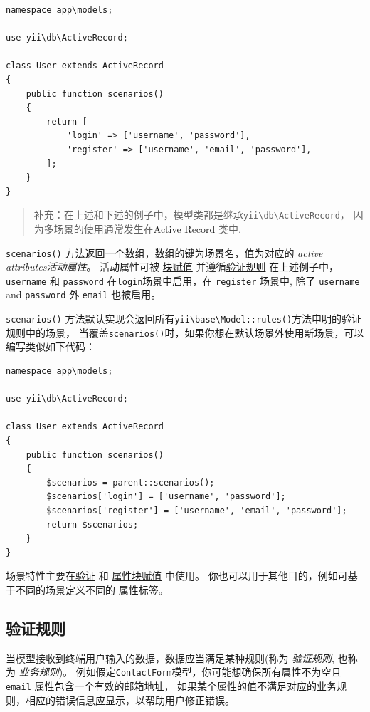 \lstset{language=php}\begin{lstlisting}
namespace app\models;

use yii\db\ActiveRecord;

class User extends ActiveRecord
{
    public function scenarios()
    {
        return [
            'login' => ['username', 'password'],
            'register' => ['username', 'email', 'password'],
        ];
    }
}
\end{lstlisting}
\begin{quote}补充：在上述和下述的例子中，模型类都是继承\texttt{yii{\allowbreak{}\textbackslash}db{\allowbreak{}\textbackslash}ActiveRecord}，
  因为多场景的使用通常发生在\hyperref[db-active-record.md]{Active Record} 类中.

\end{quote}
\lstinline|scenarios()| 方法返回一个数组，数组的键为场景名，值为对应的 \textit{active attributes活动属性}。
活动属性可被 \hyperref[structure-models.md::::massive-assignment]{块赋值} 并遵循\hyperref[structure-models.md::::validation-rules]{验证规则}
在上述例子中，\lstinline|username| 和 \lstinline|password| 在\lstinline|login|场景中启用，在 \lstinline|register| 场景中, 
除了 \lstinline|username| and \lstinline|password| 外 \lstinline|email| 也被启用。

\lstinline|scenarios()| 方法默认实现会返回所有\texttt{yii{\allowbreak{}\textbackslash}base{\allowbreak{}\textbackslash}Model\allowbreak{}::\allowbreak{}rules()}方法申明的验证规则中的场景，
当覆盖\lstinline|scenarios()|时，如果你想在默认场景外使用新场景，可以编写类似如下代码：

\lstset{language=php}\begin{lstlisting}
namespace app\models;

use yii\db\ActiveRecord;

class User extends ActiveRecord
{
    public function scenarios()
    {
        $scenarios = parent::scenarios();
        $scenarios['login'] = ['username', 'password'];
        $scenarios['register'] = ['username', 'email', 'password'];
        return $scenarios;
    }
}
\end{lstlisting}
场景特性主要在\hyperref[structure-models.md::::validation-rules]{验证} 和 \hyperref[structure-models.md::::massive-assignment]{属性块赋值} 中使用。
你也可以用于其他目的，例如可基于不同的场景定义不同的 \hyperref[structure-models.md::::attribute-labels]{属性标签}。

\subsection{验证规则 \label{structure-models.md::validation-rules}}
当模型接收到终端用户输入的数据，数据应当满足某种规则(称为 \textit{验证规则}, 也称为 \textit{业务规则})。
例如假定\lstinline|ContactForm|模型，你可能想确保所有属性不为空且 \lstinline|email| 属性包含一个有效的邮箱地址，
如果某个属性的值不满足对应的业务规则，相应的错误信息应显示，以帮助用户修正错误。

